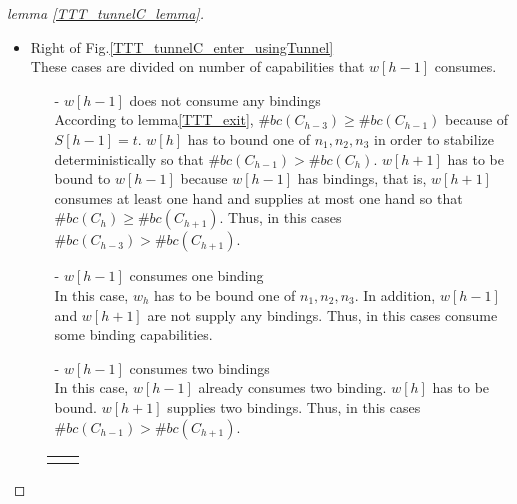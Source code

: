 \documentclass[runningheads]{llncs}
\begin{document}
\begin{proof}[lemma \ref{TTT_tunnelC_lemma}]
\begin{itemize}
\item{Right of Fig.\ref{TTT_tunnelC_enter_usingTunnel}}\\
  These cases are divided on number of capabilities that $w[h-1]$ consumes.
  \begin{itemize}
  \item[-]{$w[h-1]$ does not consume any bindings}\\
  According to lemma\ref{TTT_exit}, $\#bc(C_{h-3}) \geq \#bc(C_{h-1})$ because of $S[h-1] = t$.
    $w[h]$ has to bound one of $n_1, n_2, n_3$ in order to stabilize deterministically so that  $\#bc(C_{h-1}) > \#bc(C_{h})$.
    $w[h+1]$ has to be bound to $w[h-1]$ because $w[h-1]$ has bindings, that is, $w[h+1]$ consumes at least one hand and supplies at most one hand so that $\#bc(C_{h}) \geq \#bc(C_{h+1})$. Thus, in this cases $\#bc(C_{h-3}) > \#bc(C_{h+1})$.

  \item[-]{$w[h-1]$ consumes one binding}\\
    In this case, $w_{h}$ has to be bound one of $n_1, n_2, n_3$. In addition, $w[h-1]$ and $w[h+1]$ are not supply any bindings. Thus, in this cases consume some binding capabilities.
  \item[-]{$w[h-1]$ consumes two bindings}\\
    In this case, $w[h-1]$ already consumes two binding. $w[h]$ has to be bound. $w[h+1]$ supplies two bindings. Thus, in this cases $\#bc(C_{h-1}) > \#bc(C_{h+1})$.
   
  \end{itemize}
\end{itemize}
\begin{figure}
  \centering
    \begin{tabular}{cc}
      
      \begin{minipage}{0.48\hsize}
      \centering
        \begin{tikzpicture}


\end{tikzpicture}
\end{minipage}
\end{tabular}
\end{figure}
\end{proof}
\end{document}
